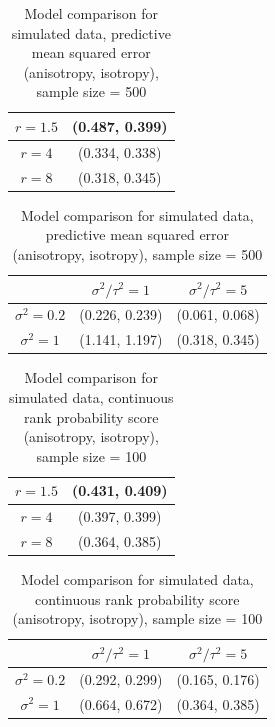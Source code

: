 \documentclass[12pt,twoside]{dukestatscithesis}
\theoremstyle{definition}
\theoremstyle{definition}
\theoremstyle{definition}
\theoremstyle{remark}
\begin{document}
\begin{table}[H]
\centering
\setlength{\extrarowheight}{10pt}
\hspace*{-1.5cm}
\begin{tabular}{|c|c|}
\hline
$r = 1.5$ & (0.487, 0.399) \\[5pt]
\hline
$r = 4$ & (0.334, 0.338) \\[5pt]
\hline
$r = 8$ & (0.318, 0.345) \\[5pt]
\hline
\end{tabular}
\quad
\begin{tabular}{|c|c|c|}
\hline
 & $\sigma^2/\tau^2 = 1 $ & $\sigma^2/\tau^2 = 5$\\[8pt]
\hline
$\sigma^2 = 0.2$ & (0.226, 0.239) & (0.061, 0.068)\\[8pt]
\hline
$\sigma^2 = 1$ & (1.141, 1.197) & (0.318, 0.345) \\[8pt]
\hline
\end{tabular}
\hspace*{-1.5cm}
\caption{Model comparison for simulated data, predictive mean squared error (anisotropy, isotropy), sample size = 500}
\end{table}
\begin{table}[H]
\centering
\setlength{\extrarowheight}{10pt}
\hspace*{-1.5cm}
\begin{tabular}{|c|c|}
\hline
$r = 1.5$ & (0.431, 0.409) \\[5pt]
\hline
$r = 4$ & (0.397, 0.399) \\[5pt]
\hline
$r = 8$ & (0.364, 0.385) \\[5pt]
\hline
\end{tabular}
\quad
\begin{tabular}{|c|c|c|}
\hline
 & $\sigma^2/\tau^2 = 1 $ & $\sigma^2/\tau^2 = 5$\\[8pt]
\hline
$\sigma^2 = 0.2$ & (0.292, 0.299) & (0.165, 0.176)\\[8pt]
\hline
$\sigma^2 = 1$ & (0.664, 0.672) & (0.364, 0.385) \\[8pt]
\hline
\end{tabular}
\hspace*{-1.5cm}
\caption{Model comparison for simulated data, continuous rank probability score (anisotropy, isotropy), sample size = 100}
\end{table}
\end{document}
